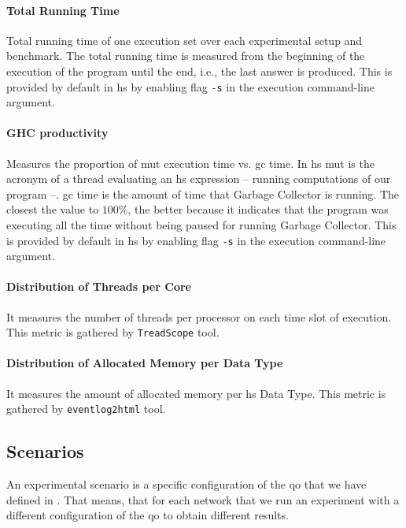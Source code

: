 \paragraph{Total Running Time} Total running time of one execution set over each experimental setup and benchmark. 
The total running time is measured from the beginning of the execution of the program until the end, i.e., the last answer is produced.
This is provided by default in \acrshort{hs} by enabling flag \texttt{-s} in the execution command-line argument.

\paragraph{GHC productivity} Measures the proportion of \acrfull{mut} execution time vs. \acrfull{gc} time. 
In \acrlong{hs} \acrlong{mut} is the acronym of a thread evaluating an \acrshort{hs} expression -- running computations of our program --. 
\acrshort{gc} time is the amount of time that Garbage Collector is running. 
The closest the value to $100\%$, the better because it indicates that the program was executing all the time without being paused for running Garbage Collector. 
This is provided by default in \acrshort{hs} by enabling flag \texttt{-s} in the execution command-line argument.

\paragraph{Distribution of Threads per Core} It measures the number of threads per processor on each time slot of execution.
This metric is gathered by \texttt{TreadScope} \cite{threadscope} tool.

\paragraph{Distribution of Allocated Memory per Data Type} It measures the amount of allocated memory per \acrshort{hs} Data Type. 
This metric is gathered by \texttt{eventlog2html} \cite{eventlog2html} tool.
    
\subsection{Scenarios}\label{sub:exp:exp-data-setup}
An experimental scenario is a specific configuration of the \acrlong{qo} that we have defined in . 
That means, that for each network that we run an experiment with a different configuration of the \acrshort{qo} to obtain different results.

